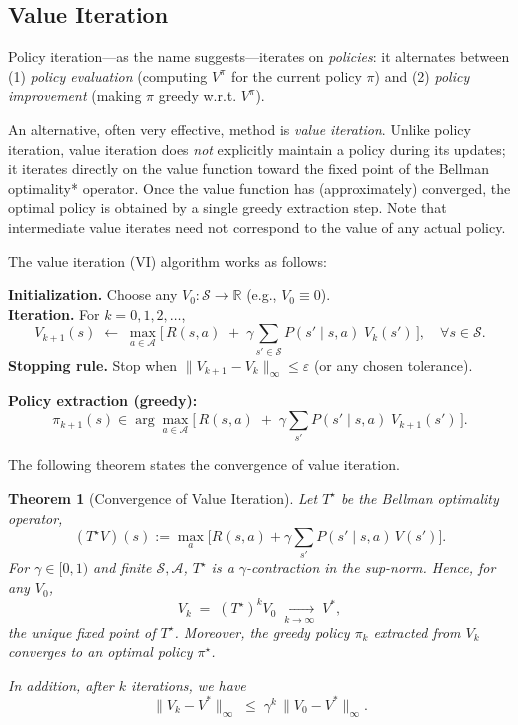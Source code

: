 \documentclass[
]{book}
\newtheorem{theorem}{Theorem}[chapter]
\theoremstyle{definition}
\theoremstyle{definition}
\theoremstyle{definition}
\theoremstyle{definition}
\theoremstyle{remark}
\begin{document}
\subsection{Value Iteration}\label{value-iteration}

Policy iteration---as the name suggests---iterates on \emph{policies}: it alternates between
(1) \emph{policy evaluation} (computing \(V^{\pi}\) for the current policy \(\pi\)) and
(2) \emph{policy improvement} (making \(\pi\) greedy w.r.t. \(V^{\pi}\)).

An alternative, often very effective, method is \emph{value iteration}. Unlike policy iteration, value iteration does \emph{not} explicitly maintain a policy during its updates; it iterates directly on the value function toward the fixed point of the Bellman optimality* operator. Once the value function has (approximately) converged, the optimal policy is obtained by a single greedy extraction step. Note that intermediate value iterates need not correspond to the value of any actual policy.

The value iteration (VI) algorithm works as follows:

\textbf{Initialization.} Choose any \(V_0:\mathcal{S}\to\mathbb{R}\) (e.g., \(V_0 \equiv 0\)).\\
\textbf{Iteration.} For \(k=0,1,2,\dots\),
\[
V_{k+1}(s) \;\leftarrow\; \max_{a\in\mathcal{A}}
\Big[\, R(s,a) \;+\; \gamma \sum_{s'\in\mathcal{S}} P(s'\mid s,a)\; V_k(s') \,\Big],
\quad \forall s\in\mathcal{S}.
\]
\textbf{Stopping rule.} Stop when \(\lVert V_{k+1}-V_k\rVert_\infty \le \varepsilon\) (or any chosen tolerance).

\textbf{Policy extraction (greedy):}
\[
\pi_{k+1}(s) \in \arg\max_{a\in\mathcal{A}}
\Big[\, R(s,a) \;+\; \gamma \sum_{s'} P(s'\mid s,a)\; V_{k+1}(s') \,\Big].
\]

The following theorem states the convergence of value iteration.

\begin{theorem}[Convergence of Value Iteration]
\protect\hypertarget{thm:ValueIterationConvergence}{}\label{thm:ValueIterationConvergence}Let \(T^\star\) be the Bellman optimality operator,
\[
(T^\star V)(s) := \max_{a}\Big[ R(s,a) + \gamma \sum_{s'} P(s'\mid s,a)\, V(s') \Big].
\]
For \(\gamma\in[0,1)\) and finite \(\mathcal{S},\mathcal{A}\), \(T^\star\) is a \(\gamma\)-contraction in the sup-norm. Hence, for any \(V_0\),
\[
V_k \;=\; (T^\star )^k V_0 \;\xrightarrow[k\to\infty]{}\; V^*,
\]
the unique fixed point of \(T^\star\). Moreover, the greedy policy \(\pi_k\) extracted from \(V_k\) converges to an optimal policy \(\pi^\star\).

In addition, after \(k\) iterations, we have
\[
\lVert V_k - V^* \rVert_\infty \;\le\; \gamma^k \, \lVert V_0 - V^* \rVert_\infty.
\]
\end{theorem}
\end{document}
